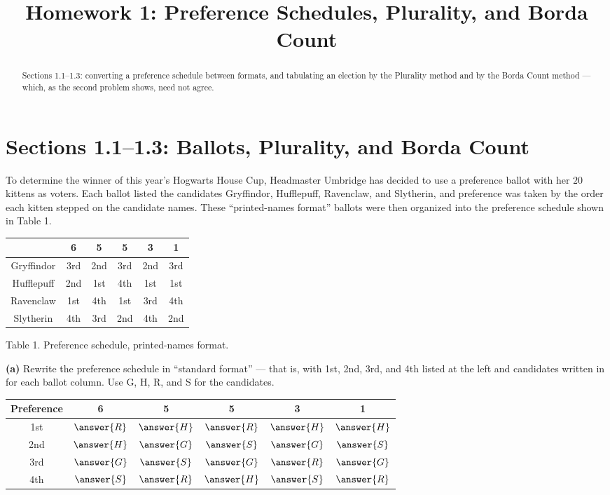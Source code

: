 \documentclass[12pt]{ximera}
\title{Homework 1: Preference Schedules, Plurality, and Borda Count}
\begin{document}
\begin{abstract}
Sections 1.1--1.3: converting a preference schedule between formats, and tabulating an
election by the Plurality method and by the Borda Count method --- which, as the second
problem shows, need not agree.
\end{abstract}
\maketitle

\section*{Sections 1.1--1.3: Ballots, Plurality, and Borda Count}

\begin{problem}
To determine the winner of this year's Hogwarts House Cup, Headmaster Umbridge has
decided to use a preference ballot with her $20$ kittens as voters. Each ballot listed
the candidates Gryffindor, Hufflepuff, Ravenclaw, and Slytherin, and preference was
taken by the order each kitten stepped on the candidate names. These
``printed-names format'' ballots were then organized into the preference schedule
shown in Table 1.

\begin{center}
\begin{tabular}{c|ccccc}
 & 6 & 5 & 5 & 3 & 1 \\\hline
Gryffindor & 3rd & 2nd & 3rd & 2nd & 3rd \\
Hufflepuff & 2nd & 1st & 4th & 1st & 1st \\
Ravenclaw  & 1st & 4th & 1st & 3rd & 4th \\
Slytherin  & 4th & 3rd & 2nd & 4th & 2nd
\end{tabular}

\smallskip
Table 1. Preference schedule, printed-names format.
\end{center}

\begin{prompt}
\textbf{(a)} Rewrite the preference schedule in ``standard format'' --- that is, with
1st, 2nd, 3rd, and 4th listed at the left and candidates written in for each ballot
column. Use G, H, R, and S for the candidates.

\begin{center}
\begin{tabular}{c|ccccc}
Preference & 6 & 5 & 5 & 3 & 1 \\\hline
1st & $\answer{R}$ & $\answer{H}$ & $\answer{R}$ & $\answer{H}$ & $\answer{H}$ \\
2nd & $\answer{H}$ & $\answer{G}$ & $\answer{S}$ & $\answer{G}$ & $\answer{S}$ \\
3rd & $\answer{G}$ & $\answer{S}$ & $\answer{G}$ & $\answer{R}$ & $\answer{G}$ \\
4th & $\answer{S}$ & $\answer{R}$ & $\answer{H}$ & $\answer{S}$ & $\answer{R}$
\end{tabular}
\end{center}


\end{prompt}
\end{problem}
\end{document}
